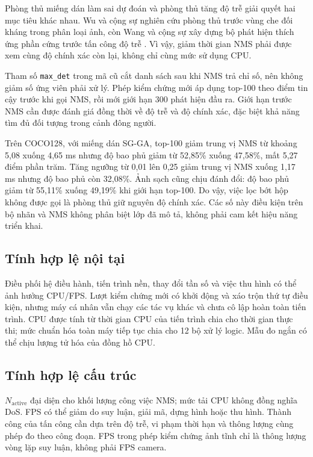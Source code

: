 \documentclass[a4paper,fleqn]{cas-dc}
\begin{document}
Phòng thủ miếng dán làm sai dự đoán và phòng thủ tăng độ trễ giải quyết hai mục tiêu khác nhau. Wu và cộng sự nghiên cứu phòng thủ trước vùng che đối kháng trong phân loại ảnh, còn Wang và cộng sự xây dựng bộ phát hiện thích ứng phần cứng trước tấn công độ trễ \cite{wu2019,wang2025defense}. Vì vậy, giảm thời gian NMS phải được xem cùng độ chính xác còn lại, không chỉ cùng mức sử dụng CPU.

Tham số \texttt{max\_det} trong mã cũ cắt danh sách sau khi NMS trả chỉ số, nên không giảm số ứng viên phải xử lý. Phép kiểm chứng mới áp dụng top-100 theo điểm tin cậy trước khi gọi NMS, rồi mới giới hạn 300 phát hiện đầu ra. Giới hạn trước NMS cần được đánh giá đồng thời về độ trễ và độ chính xác, đặc biệt khả năng tìm đủ đối tượng trong cảnh đông người.

Trên COCO128, với miếng dán SG-GA, top-100 giảm trung vị NMS từ khoảng 5,08 xuống 4,65 ms nhưng độ bao phủ giảm từ 52,85\% xuống 47,58\%, mất 5,27 điểm phần trăm. Tăng ngưỡng từ 0,01 lên 0,25 giảm trung vị NMS xuống 1,17 ms nhưng độ bao phủ còn 32,08\%. Ảnh sạch cũng chịu đánh đổi: độ bao phủ giảm từ 55,11\% xuống 49,19\% khi giới hạn top-100. Do vậy, việc lọc bớt hộp không được gọi là phòng thủ giữ nguyên độ chính xác. Các số này điều kiện trên bộ nhãn và NMS không phân biệt lớp đã mô tả, không phải cam kết hiệu năng triển khai.


\subsection{Tính hợp lệ nội tại}

Điều phối hệ điều hành, tiến trình nền, thay đổi tần số và việc thu hình có thể ảnh hưởng CPU/FPS. Lượt kiểm chứng mới có khởi động và xáo trộn thứ tự điều kiện, nhưng máy cá nhân vẫn chạy các tác vụ khác và chưa cô lập hoàn toàn tiến trình. CPU được tính từ thời gian CPU của tiến trình chia cho thời gian thực thi; mức chuẩn hóa toàn máy tiếp tục chia cho 12 bộ xử lý logic. Mẫu đo ngắn có thể chịu lượng tử hóa của đồng hồ CPU.

\subsection{Tính hợp lệ cấu trúc}

$N_{\mathrm{active}}$ đại diện cho khối lượng công việc NMS; mức tải CPU không đồng nghĩa DoS. FPS có thể giảm do suy luận, giải mã, dựng hình hoặc thu hình. Thành công của tấn công cần dựa trên độ trễ, vi phạm thời hạn và thông lượng cùng phép đo theo công đoạn. FPS trong phép kiểm chứng ảnh tĩnh chỉ là thông lượng vòng lặp suy luận, không phải FPS camera.
\end{document}
